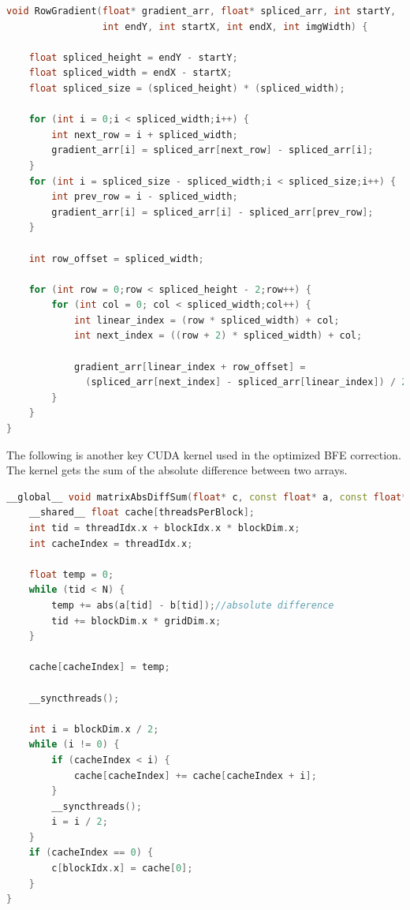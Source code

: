 \documentclass[DM,authoryear,toc]{lsstdoc}
\begin{document}
\begin{lstlisting}[language=C++,basicstyle=\small,frame=single]
void RowGradient(float* gradient_arr, float* spliced_arr, int startY,
                 int endY, int startX, int endX, int imgWidth) {

    float spliced_height = endY - startY;
    float spliced_width = endX - startX;
    float spliced_size = (spliced_height) * (spliced_width);

    for (int i = 0;i < spliced_width;i++) {
        int next_row = i + spliced_width;
        gradient_arr[i] = spliced_arr[next_row] - spliced_arr[i];
    }
    for (int i = spliced_size - spliced_width;i < spliced_size;i++) {
        int prev_row = i - spliced_width;
        gradient_arr[i] = spliced_arr[i] - spliced_arr[prev_row];
    }

    int row_offset = spliced_width;
  
    for (int row = 0;row < spliced_height - 2;row++) {
        for (int col = 0; col < spliced_width;col++) {
            int linear_index = (row * spliced_width) + col;
            int next_index = ((row + 2) * spliced_width) + col;

            gradient_arr[linear_index + row_offset] =
              (spliced_arr[next_index] - spliced_arr[linear_index]) / 2;
        }
    }
}
\end{lstlisting}

The following is another key CUDA kernel used in the optimized BFE correction. The kernel gets the sum of the absolute difference between two arrays.

\begin{lstlisting}[language=C++,basicstyle=\small,frame=single]
__global__ void matrixAbsDiffSum(float* c, const float* a, const float* b) {
    __shared__ float cache[threadsPerBlock];
    int tid = threadIdx.x + blockIdx.x * blockDim.x;
    int cacheIndex = threadIdx.x;

    float temp = 0;
    while (tid < N) {
        temp += abs(a[tid] - b[tid]);//absolute difference
        tid += blockDim.x * gridDim.x;
    }

    cache[cacheIndex] = temp;

    __syncthreads();

    int i = blockDim.x / 2;
    while (i != 0) {
        if (cacheIndex < i) {
            cache[cacheIndex] += cache[cacheIndex + i];
        }
        __syncthreads();
        i = i / 2;
    }
    if (cacheIndex == 0) {
        c[blockIdx.x] = cache[0];
    }
}
\end{lstlisting}
\end{document}
